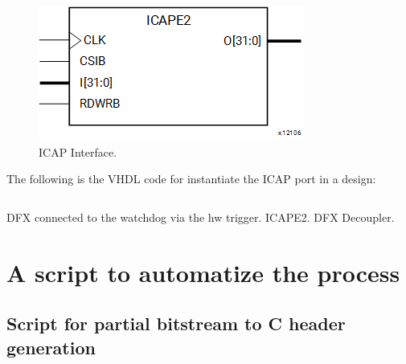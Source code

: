 \begin{figure}[H]
\centering
\includegraphics[width=0.4\linewidth]{images/chapter4/icap.png}
\caption{ICAP Interface.}
\end{figure}

The following is the VHDL code for instantiate the ICAP port in a design:

\begin{lstlisting}[language=VHDL]

\end{lstlisting}

DFX connected to the watchdog via the hw trigger.
ICAPE2. DFX Decoupler.


\section{A script to automatize the process}
\subsection{Script for partial bitstream to C header generation}
\label{sec:script_header}